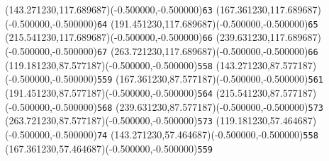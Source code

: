 \documentclass[12pt]{article}
\begin{document}
\ASYalign(143.271230,117.689687)(-0.500000,-0.500000){\texttt{63}}%
\color{ASYcolor}
\fontsize{12.000000}{14.400000}\selectfont
\ASYalign(167.361230,117.689687)(-0.500000,-0.500000){\texttt{64}}%
\color{ASYcolor}
\fontsize{12.000000}{14.400000}\selectfont
\ASYalign(191.451230,117.689687)(-0.500000,-0.500000){\texttt{65}}%
\color{ASYcolor}
\fontsize{12.000000}{14.400000}\selectfont
\ASYalign(215.541230,117.689687)(-0.500000,-0.500000){\texttt{66}}%
\color{ASYcolor}
\fontsize{12.000000}{14.400000}\selectfont
\ASYalign(239.631230,117.689687)(-0.500000,-0.500000){\texttt{67}}%
\color{ASYcolor}
\fontsize{12.000000}{14.400000}\selectfont
\ASYalign(263.721230,117.689687)(-0.500000,-0.500000){\texttt{66}}%
\color{ASYcolor}
\fontsize{12.000000}{14.400000}\selectfont
\ASYalign(119.181230,87.577187)(-0.500000,-0.500000){\texttt{558}}%
\color{ASYcolor}
\fontsize{12.000000}{14.400000}\selectfont
\ASYalign(143.271230,87.577187)(-0.500000,-0.500000){\texttt{559}}%
\color{ASYcolor}
\fontsize{12.000000}{14.400000}\selectfont
\ASYalign(167.361230,87.577187)(-0.500000,-0.500000){\texttt{561}}%
\color{ASYcolor}
\fontsize{12.000000}{14.400000}\selectfont
\ASYalign(191.451230,87.577187)(-0.500000,-0.500000){\texttt{564}}%
\color{ASYcolor}
\fontsize{12.000000}{14.400000}\selectfont
\ASYalign(215.541230,87.577187)(-0.500000,-0.500000){\texttt{568}}%
\color{ASYcolor}
\fontsize{12.000000}{14.400000}\selectfont
\ASYalign(239.631230,87.577187)(-0.500000,-0.500000){\texttt{573}}%
\color{ASYcolor}
\fontsize{12.000000}{14.400000}\selectfont
\ASYalign(263.721230,87.577187)(-0.500000,-0.500000){\texttt{573}}%
\color{ASYcolor}
\fontsize{12.000000}{14.400000}\selectfont
\ASYalign(119.181230,57.464687)(-0.500000,-0.500000){\texttt{74}}%
\color{ASYcolor}
\fontsize{12.000000}{14.400000}\selectfont
\ASYalign(143.271230,57.464687)(-0.500000,-0.500000){\texttt{558}}%
\color{ASYcolor}
\fontsize{12.000000}{14.400000}\selectfont
\ASYalign(167.361230,57.464687)(-0.500000,-0.500000){\texttt{559}}%
\color{ASYcolor}
\end{document}
